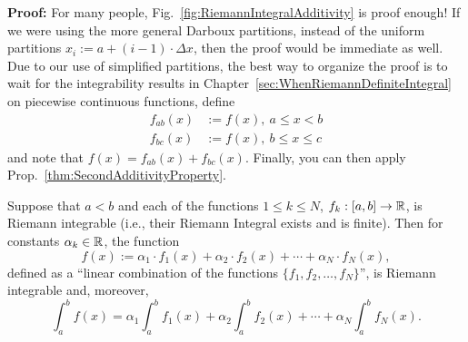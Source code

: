 \textbf{Proof:} For many people, Fig.~\ref{fig:RiemannIntegralAdditivity} is proof enough! If we were using the more general Darboux partitions, instead of the uniform partitions $x_i:=a + (i-1)\cdot \Delta x$, then the proof would be immediate as well. Due to our use of simplified partitions, the best way to organize the proof is to wait for the integrability results in Chapter~\ref{sec:WhenRiemannDefiniteIntegral} on piecewise continuous functions, define
\begin{align*}
    f_{ab}(x) &:= f(x), ~ a \le x < b\\
    f_{bc}(x) &:= f(x), ~ b \le x \le c
\end{align*}
and note that $f(x) = f_{ab}(x) + f_{bc}(x)$. Finally, you can then apply Prop.~\ref{thm:SecondAdditivityProperty}.
\Qed

\bigskip









\begin{tcolorbox}[title=\textcolor{black}{Proof of Prop.~\ref{thm:SecondAdditivityProperty} (Linearity of the Riemann Integral)}, sharp corners, colback=green!30, colframe=green!80!blue, breakable, fonttitle=\bfseries]

Suppose that $a < b$ and each of the functions $1 \le k \le N$, $f_k:[a, b] \to \mathbb R$, is Riemann integrable (i.e., their Riemann Integral exists and is finite). Then for constants $\alpha_k \in \mathbb R$, the function
$$ f(x):= \alpha_1 \cdot f_1(x) + \alpha_2 \cdot f_2(x) + \cdots + \alpha_N \cdot f_N(x),$$
defined as a ``linear combination of the functions $\{ f_1, f_2, \ldots, f_N\}$'', is Riemann integrable and, moreover, 
$$
    \int_a^b f(x) = \alpha_1 \int_a^b   f_1(x) + \alpha_2 \int_a^b  f_2(x) + \cdots + \alpha_N  \int_a^b f_N(x).
$$   

\end{tcolorbox}


